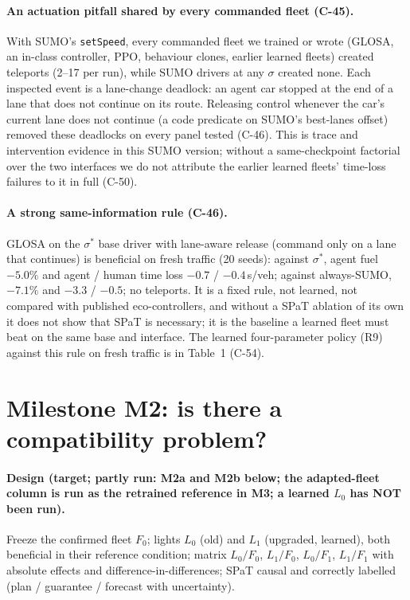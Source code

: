 \documentclass[11pt]{article}
\begin{document}
\paragraph{An actuation pitfall shared by every commanded fleet (C-45).} With SUMO's \texttt{setSpeed}, every commanded fleet we
trained or wrote (GLOSA, an in-class controller, PPO, behaviour clones, earlier learned fleets) created teleports (2--17 per run), while
SUMO drivers at any $\sigma$ created none. Each inspected event is a lane-change deadlock: an agent car stopped at the end of a lane that does
not continue on its route. Releasing control whenever the car's current lane does not continue (a code predicate on SUMO's best-lanes
offset) removed these deadlocks on every panel tested (C-46). This is trace and intervention evidence in this SUMO version; without a
same-checkpoint factorial over the two interfaces we do not attribute the earlier learned fleets' time-loss failures to it in full (C-50).
\paragraph{A strong same-information rule (C-46).} GLOSA on the $\sigma^*$ base driver with lane-aware release (command only on a lane
that continues) is beneficial on fresh traffic (20 seeds): against $\sigma^*$, agent fuel $-5.0\%$ and agent / human time loss $-0.7$ /
$-0.4$\,s/veh; against always-SUMO, $-7.1\%$ and $-3.3$ / $-0.5$; no teleports. It is a fixed rule, not learned, not compared with
published eco-controllers, and without a SPaT ablation of its own it does not show that SPaT is necessary; it is the baseline a learned
fleet must beat on the same base and interface.
The learned four-parameter policy (R9) against this rule on fresh traffic is in Table~1 (C-54).

\section{Milestone M2: is there a compatibility problem?}
\paragraph{Design (target; partly run: M2a and M2b below; the adapted-fleet column is run as the retrained reference in M3; a learned $L_0$ has NOT been run).} Freeze the confirmed fleet $F_0$; lights $L_0$ (old) and $L_1$ (upgraded, learned), both beneficial in their
reference condition; matrix $L_0/F_0$, $L_1/F_0$, $L_0/F_1$, $L_1/F_1$ with absolute effects and difference-in-differences; SPaT
causal and correctly labelled (plan / guarantee / forecast with uncertainty).
\end{document}
